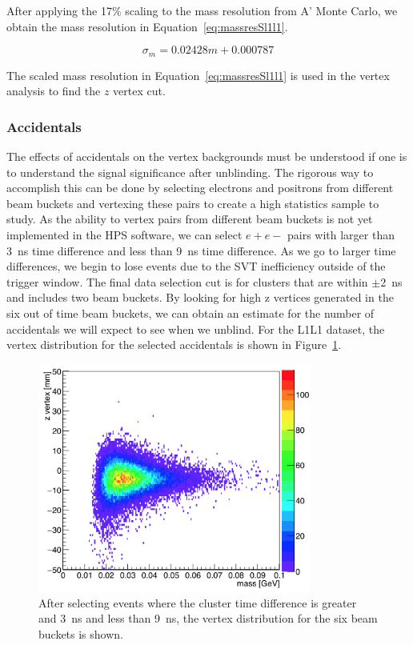 After applying the 17$\%$ scaling to the mass resolution from A' Monte Carlo, we obtain the mass resolution in Equation~\eqref{eq:massresSl1l1}.

\begin{equation}
\label{eq:massresSl1l1}
\sigma_m = 0.02428m+0.000787
\end{equation}

The scaled mass resolution in Equation~\eqref{eq:massresSl1l1} is used in the vertex analysis to find the $z$ vertex cut. 

 \subsubsection{Accidentals}

The effects of accidentals on the vertex backgrounds must be understood if one is to understand the signal significance after unblinding. The rigorous way to accomplish this can be done by selecting electrons and positrons from different beam buckets and vertexing these pairs to create a high statistics sample to study. As the ability to vertex pairs from different beam buckets is not yet implemented in the HPS software, we can select $e+e-$ pairs with larger than 3~ns time difference and less than 9~ns time difference. As we go to larger time differences, we begin to lose events due to the SVT inefficiency outside of the trigger window. The final data selection cut is for clusters that are within $\pm$2~ns and includes two beam buckets. By looking for high z vertices generated in the six out of time beam buckets, we can obtain an estimate for the number of accidentals we will expect to see when we unblind. For the L1L1 dataset, the vertex distribution for the selected accidentals is shown in Figure~\ref{fig:acc_L1L1}.

\begin{figure}[H]
  \centering
     \includegraphics[width=0.8\textwidth]{plots/zVm_acc_L1L1.png}
  \caption{After selecting events where the cluster time difference is greater and 3~ns and less than 9~ns, the vertex distribution for the six beam buckets is shown.}
  \label{fig:acc_L1L1}
\end{figure} 

